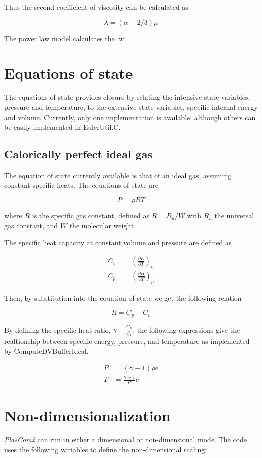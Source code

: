 Thus the second coefficient of viscosity can be calculated as

\[ \lambda = \left(\alpha - 2/3\right) \mu \]

The power law model calculates the \+:w\hypertarget{theory_eos}{}\section{Equations of state}\label{theory_eos}
The equations of state provides closure by relating the intensive state variables, pressure and temperature, to the extensive state variables, specific internal energy and volume. Currently, only one implementation is available, although others can be easily implemented in Euler\+Util.\+C.\hypertarget{theory_calIdealGas}{}\subsection{Calorically perfect ideal gas}\label{theory_calIdealGas}
The equation of state currently available is that of an ideal gas, assuming constant specific heats. The equations of state are

\[ P = \rho R T \]

where $R$ is the specific gas constant, defined as $R = R_u / W$ with $R_u$ the universal gas constant, and $W$ the molecular weight.

The specific heat capacity at constant volume and pressure are defined as

\[ \begin{align} C_v &= \left(\frac{\partial E}{\partial T}\right)_v \\ C_p &= \left(\frac{\partial H}{\partial T}\right)_p \end{align} \]

Then, by substitution into the equation of state we get the following relation

\[ R = C_p - C_v \]

By defining the specific heat ratio, $\gamma = \frac{C_p}{C_v}$, the following expressions give the realtionship between specific energy, pressure, and temperature as implemented by Compute\+D\+V\+Buffer\+Ideal.

\[ \begin{align} P &= (\gamma -1) \rho e \\ T &= \frac{\gamma-1}{R} e \end{align} \]\hypertarget{theory_nondimen}{}\section{Non-\/dimensionalization}\label{theory_nondimen}
{\itshape Plas\+Com2} can run in either a dimensional or non-\/dimensional mode. The code uses the following variables to define the non-\/dimensional scaling\+:


